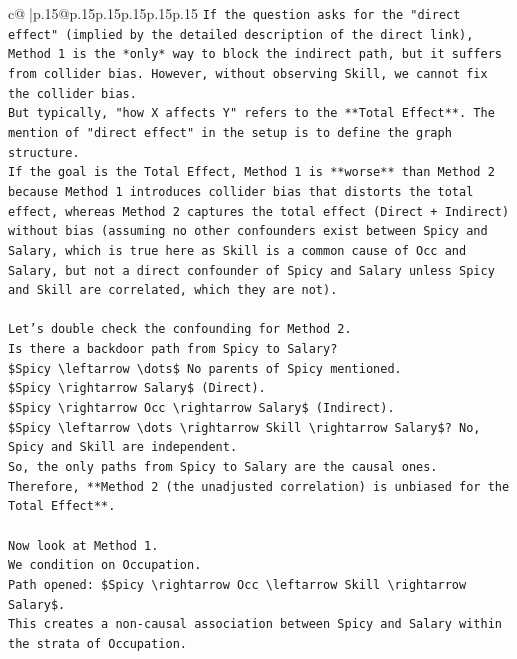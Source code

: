 \documentclass{article}
\begin{document}
{\begin{supertabular}{c@{$\;$}|p{.15\linewidth}@{}p{.15\linewidth}p{.15\linewidth}p{.15\linewidth}p{.15\linewidth}p{.15\linewidth}}
{{{\texttt{If the question asks for the "direct effect" (implied by the detailed description of the direct link), Method 1 is the *only* way to block the indirect path, but it suffers from collider bias. However, without observing Skill, we cannot fix the collider bias.} \\
\texttt{But typically, "how X affects Y" refers to the **Total Effect**. The mention of "direct effect" in the setup is to define the graph structure.} \\
\texttt{If the goal is the Total Effect, Method 1 is **worse** than Method 2 because Method 1 introduces collider bias that distorts the total effect, whereas Method 2 captures the total effect (Direct + Indirect) without bias (assuming no other confounders exist between Spicy and Salary, which is true here as Skill is a common cause of Occ and Salary, but not a direct confounder of Spicy and Salary unless Spicy and Skill are correlated, which they are not).} \\
\\ 
\texttt{Let's double check the confounding for Method 2.} \\
\texttt{Is there a backdoor path from Spicy to Salary?} \\
\texttt{\$Spicy \textbackslash{}leftarrow \textbackslash{}dots\$ No parents of Spicy mentioned.} \\
\texttt{\$Spicy \textbackslash{}rightarrow Salary\$ (Direct).} \\
\texttt{\$Spicy \textbackslash{}rightarrow Occ \textbackslash{}rightarrow Salary\$ (Indirect).} \\
\texttt{\$Spicy \textbackslash{}leftarrow \textbackslash{}dots \textbackslash{}rightarrow Skill \textbackslash{}rightarrow Salary\$? No, Spicy and Skill are independent.} \\
\texttt{So, the only paths from Spicy to Salary are the causal ones.} \\
\texttt{Therefore, **Method 2 (the unadjusted correlation) is unbiased for the Total Effect**.} \\
\\ 
\texttt{Now look at Method 1.} \\
\texttt{We condition on Occupation.} \\
\texttt{Path opened: \$Spicy \textbackslash{}rightarrow Occ \textbackslash{}leftarrow Skill \textbackslash{}rightarrow Salary\$.} \\
\texttt{This creates a non{-}causal association between Spicy and Salary within the strata of Occupation.} \\
}}}
\end{supertabular}}
\end{document}

